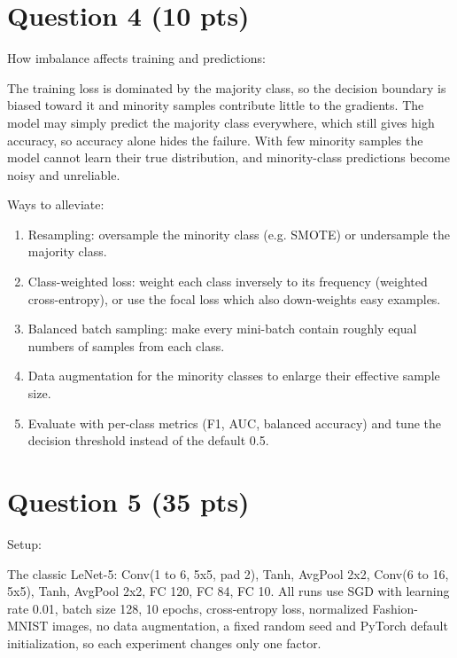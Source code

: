 \documentclass[11pt,a4paper]{article}
\begin{document}
\section*{Question 4 (10 pts)}

How imbalance affects training and predictions:

The training loss is dominated by the majority class, so the decision
boundary is biased toward it and minority samples contribute little to
the gradients. The model may simply predict the majority class
everywhere, which still gives high accuracy, so accuracy alone hides the
failure. With few minority samples the model cannot learn their true
distribution, and minority-class predictions become noisy and
unreliable.

Ways to alleviate:

\begin{enumerate}
    \item Resampling: oversample the minority class (e.g. SMOTE) or
    undersample the majority class.

    \item Class-weighted loss: weight each class inversely to its
    frequency (weighted cross-entropy), or use the focal loss which also
    down-weights easy examples.

    \item Balanced batch sampling: make every mini-batch contain
    roughly equal numbers of samples from each class.

    \item Data augmentation for the minority classes to enlarge their
    effective sample size.

    \item Evaluate with per-class metrics (F1, AUC, balanced accuracy)
    and tune the decision threshold instead of the default 0.5.
\end{enumerate}

\section*{Question 5 (35 pts)}

Setup:

The classic LeNet-5: Conv(1 to 6, 5x5, pad 2), Tanh, AvgPool 2x2,
Conv(6 to 16, 5x5), Tanh, AvgPool 2x2, FC 120, FC 84, FC 10. All runs
use SGD with learning rate 0.01, batch size 128, 10 epochs,
cross-entropy loss, normalized Fashion-MNIST images, no data
augmentation, a fixed random seed and PyTorch default initialization, so
each experiment changes only one factor.
\end{document}
